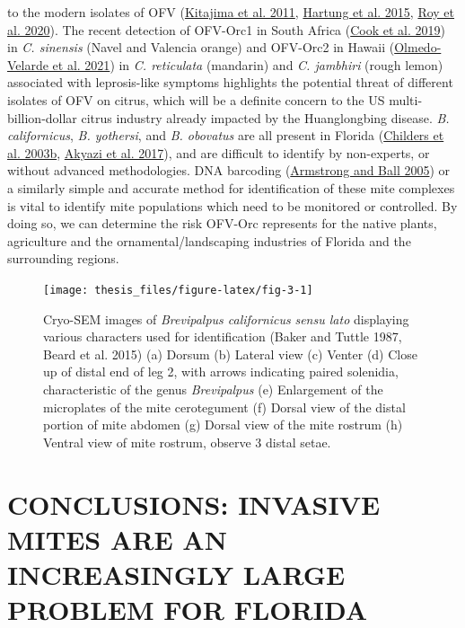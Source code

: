 \documentclass[12pt,final,CPage]{ufthesis}
\begin{document}
{to the modern isolates of OFV (\protect\hyperlink{ref-Kitajima2011a}{Kitajima et al. 2011}, \protect\hyperlink{ref-Hartung2015}{Hartung et al. 2015}, \protect\hyperlink{ref-Roy2020}{Roy et al. 2020}). The recent detection of OFV-Orc1 in South Africa (\protect\hyperlink{ref-Cook2019}{Cook et al. 2019}) in \emph{C. sinensis} (Navel and Valencia orange) and OFV-Orc2 in Hawaii (\protect\hyperlink{ref-Velarde2021}{Olmedo-Velarde et al. 2021}) in \emph{C. reticulata} (mandarin) and \emph{C. jambhiri} (rough lemon) associated with leprosis-like symptoms highlights the potential threat of different isolates of OFV on citrus, which will be a definite concern to the US multi-billion-dollar citrus industry already impacted by the Huanglongbing disease. \emph{B. californicus}, \emph{B. yothersi}, and \emph{B. obovatus} are all present in Florida (\protect\hyperlink{ref-Childers2003}{Childers et al. 2003b}, \protect\hyperlink{ref-Akyazi2017}{Akyazi et al. 2017}), and are difficult to identify by non-experts, or without advanced methodologies. DNA barcoding (\protect\hyperlink{ref-Armstrong2005}{Armstrong and Ball 2005}) or a similarly simple and accurate method for identification of these mite complexes is vital to identify mite populations which need to be monitored or controlled. By doing so, we can determine the risk OFV-Orc represents for the native plants, agriculture and the ornamental/landscaping industries of Florida and the surrounding regions.
  \begin{figure}

  {\centering \texttt{[image: thesis\_files/figure-latex/fig-3-1]} 

  }

  \caption[Cryo-SEM images of \textit{Brevipalpus californicus} \textit{sensu lato} displaying various characters used for identification]{Cryo-SEM images of \textit{Brevipalpus californicus} \textit{sensu lato} displaying various characters used for identification (Baker and Tuttle 1987, Beard et al. 2015) (a) Dorsum  (b) Lateral view (c) Venter (d) Close up of distal end of leg 2, with arrows indicating paired solenidia, characteristic of the genus \textit{Brevipalpus} (e) Enlargement of the microplates of the mite cerotegument (f) Dorsal view of the distal portion of mite abdomen (g) Dorsal view of the mite rostrum (h) Ventral view of mite rostrum, observe 3 distal setae.}\label{fig:fig-3}
  \end{figure}
  \hypertarget{conclusions-invasive-mites-are-an-increasingly-large-problem-for-florida}{%
  \chapter{CONCLUSIONS: INVASIVE MITES ARE AN INCREASINGLY LARGE PROBLEM FOR FLORIDA}\label{conclusions-invasive-mites-are-an-increasingly-large-problem-for-florida}}

}
\end{document}
